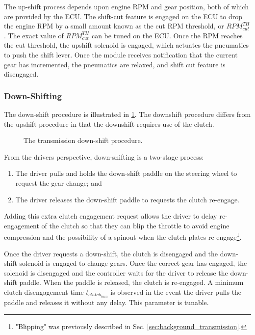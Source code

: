 The up-shift process depends upon engine RPM and gear position, both of which are provided by the ECU. The shift-cut feature is engaged on the ECU to drop the engine RPM by a small amount known as the cut RPM threshold, or $RPM^{TH}_{cut}$. The exact value of $RPM^{TH}_{cut}$ can be tuned on the ECU. Once the RPM reaches the cut threshold, the upshift solenoid is engaged, which actuates the pneumatics to push the shift lever. Once the module receives notification that the current gear has incremented, the pneumatics are relaxed, and shift cut feature is disengaged.


\subsubsection{Down-Shifting}

The down-shift procedure is illustrated in \ref{fig:transmission_downshift_flow}. The downshift procedure differs from the upshift procedure in that the downshift requires use of the clutch. 

\begin{figure}[H]
	\centering
	
	\caption{The transmission down-shift procedure.}
	\label{fig:transmission_downshift_flow}
\end{figure}

From the drivers perspective, down-shifting is a two-stage process:

\begin{enumerate}
  \item The driver pulls and holds the down-shift paddle on the steering wheel to request the gear change; and
  \item The driver releases the down-shift paddle to requests the clutch re-engage.
\end{enumerate}

Adding this extra clutch engagement request allows the driver to delay re-engagement of the clutch so that they can blip the throttle to avoid engine compression and the possibility of a spinout when the clutch plates re-engage\footnote{"Blipping" was previously described in Sec. \ref{sec:background_transmission}.}. 

Once the driver requests a down-shift, the clutch is disengaged and the down-shift solenoid is engaged to change gears. Once the correct gear has engaged, the solenoid is disengaged and the controller waits for the driver to release the down-shift paddle. When the paddle is released, the clutch is re-engaged. A minimum clutch disengagement time $t_{clutch_{min}}$ is observed in the event the driver pulls the paddle and releases it without any delay. This parameter is tunable.

